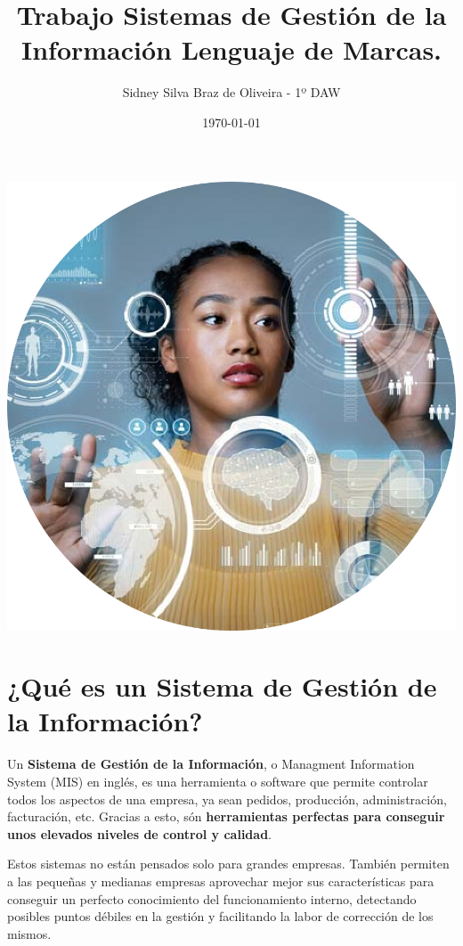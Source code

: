 \documentclass[
]{article}
\title{\Huge Trabajo Sistemas de Gestión de la Información Lenguaje de
Marcas.}
\author{Sidney Silva Braz de Oliveira - 1º DAW}
\date{\today}
\begin{document}
\maketitle

\includegraphics{./SGI.png}


\hypertarget{quuxe9-es-un-sistema-de-gestiuxf3n-de-la-informaciuxf3n}{%
\section{¿Qué es un Sistema de Gestión de la
Información?}\label{quuxe9-es-un-sistema-de-gestiuxf3n-de-la-informaciuxf3n}}

Un \textbf{Sistema de Gestión de la Información}, o Managment
Information System (MIS) en inglés, es una herramienta o software que
permite controlar todos los aspectos de una empresa, ya sean pedidos,
producción, administración, facturación, etc. Gracias a esto, són
\textbf{herramientas perfectas para conseguir unos elevados niveles de
control y calidad}.

Estos sistemas no están pensados solo para grandes empresas. También
permiten a las pequeñas y medianas empresas aprovechar mejor sus
características para conseguir un perfecto conocimiento del
funcionamiento interno, detectando posibles puntos débiles en la gestión
y facilitando la labor de corrección de los mismos.
\end{document}
